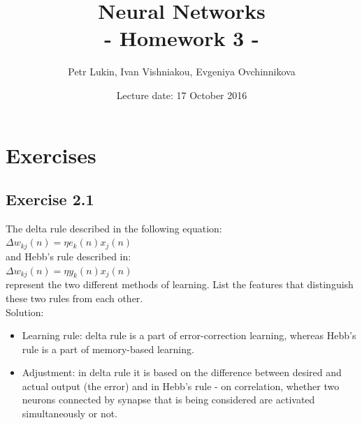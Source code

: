 \documentclass[a4paper, 12pt]{article}
\title{Neural Networks  \\
				- Homework 3 -}
\author{Petr Lukin, Ivan Vishniakou, Evgeniya Ovchinnikova}
\date{Lecture date: 17 October 2016}
\begin{document}


\maketitle


\section{Exercises}

\subsection{Exercise 2.1}

The delta rule described in the following equation:\\
$\Delta w_{kj}(n) = \eta e_k(n)x_j(n)$ \\
and Hebb's rule described in:\\
$\Delta w_{kj}(n) = \eta y_k(n)x_j(n)$\\
represent the two different methods of learning. List the features that distinguish these two rules from each other.\\

Solution:\\

\begin{itemize}
\item Learning rule: delta rule is a part of error-correction learning, whereas Hebb's rule is a part of memory-based learning.
\item Adjustment: in delta rule it is based on the difference between desired and actual output (the error) and in Hebb's rule - on correlation, whether two neurons connected by synapse that is being considered are activated simultaneously or not.
\end{itemize}
\end{document}
